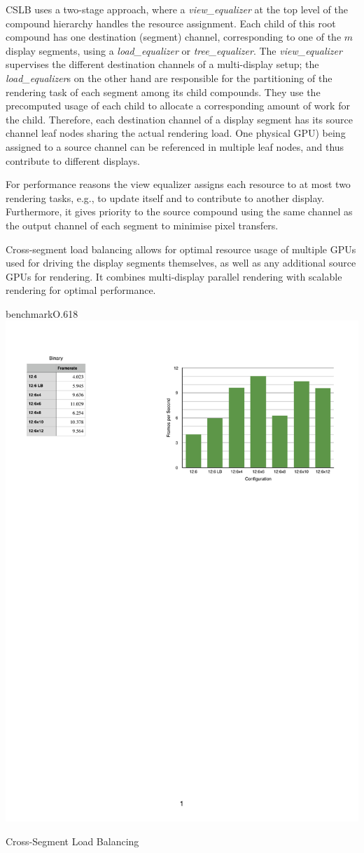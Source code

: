 CSLB uses a two-stage approach, where a {\em view\_equalizer} at the top level of the
compound hierarchy handles the resource assignment. Each child of this root
compound has one destination (segment) channel, corresponding to one of the $m$
display segments, using a {\em load\_equalizer} or {\em tree\_equalizer}.
The {\em view\_equalizer} supervises the different destination channels of a
multi-display setup; the {\em load\_equalizer}s on the other hand are
responsible for the partitioning of the rendering task of each segment among
its child compounds. They use the precomputed usage of each child to allocate a
corresponding amount of work for the child. Therefore, each destination channel
of a display segment has its source channel leaf nodes sharing the actual
rendering load. One physical GPU) being assigned to a source channel can be
referenced in multiple leaf nodes, and thus contribute to different displays.

For performance reasons the view equalizer assigns each resource to at most two
rendering tasks, e.g., to update itself and to contribute to another display.
Furthermore, it gives priority to the source compound using the same channel as
the output channel of each segment to minimise pixel transfers.

Cross-segment load balancing allows for optimal resource usage of multiple
GPUs used for driving the display segments themselves, as well as any additional
source GPUs for rendering. It combines multi-display parallel rendering with
scalable rendering for optimal performance.

\begin{wrapfloat}{benchmark}{O}{.618\textwidth}
  \includegraphics[width=.618\textwidth]{results/cslbFPS}
  \caption{\label{rCSLBFPS}Cross-Segment Load Balancing}
\end{wrapfloat}

